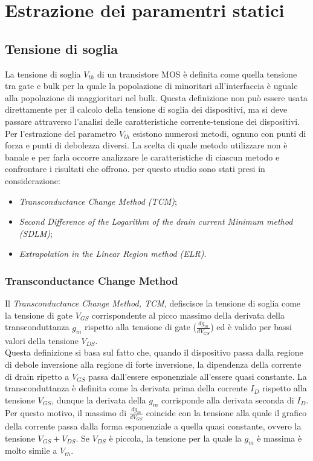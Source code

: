\documentclass[12pt, letterpaper]{book}
\begin{document}
\chapter{Estrazione dei paramentri statici}

\section{Tensione di soglia}

La tensione di soglia $V_{th}$ di un transistore MOS è definita come quella tensione tra gate e bulk per la quale la popolazione di minoritari all’interfaccia è uguale alla popolazione di maggioritari nel bulk. Questa definizione non può essere usata direttamente per il calcolo della tensione di soglia dei dispositivi, ma si deve passare attraverso l'analisi delle caratteristiche corrente-tensione dei dispositivi. \\	
Per l'estrazione del parametro $V_{th}$ esistono numerosi metodi, ognuno con punti di forza e punti di debolezza diversi. La scelta di quale metodo utilizzare non è banale e per farla occorre analizzare le caratteristiche di ciascun metodo e confrontare i risultati che offrono. per questo studio sono stati presi in considerazione:

\begin{itemize}
  \item \emph{Transconductance Change Method (TCM)};
  \item \emph{Second Difference of the Logarithm of the drain current Minimum method (SDLM)};
  \item \emph{Extrapolation in the Linear Region method (ELR)}.
\end{itemize}


\subsection{Transconductance Change Method}

Il \emph{Transconductance Change Method, TCM,} defiscisce la tensione di soglia come la tensione di gate $V_{GS}$ corrispondente al picco massimo della derivata della transconduttanza $g_m$ rispetto alla tensione di gate ($\frac{dg_m}{dV_ {GS}}$) ed è valido per bassi valori della tensione $V_{DS}$.\\
Questa definizione si basa sul fatto che, quando il dispositivo passa dalla regione di debole inversione alla regione di forte inversione, la dipendenza della corrente di drain ripetto a $V_{GS}$ passa dall'essere esponenziale all'essere quasi constante. 
La transconduttanza è definita come la derivata prima della corrente $I_D$ rispetto alla tensione $V_{GS}$, dunque la derivata della $g_m$ corrisponde alla derivata seconda di $I_D$. Per questo motivo, il massimo di $\frac{dg_m}{dV_{GS}}$ coincide con la tensione alla quale il grafico della corrente passa dalla forma esponenziale a quella quasi constante, ovvero la tensione $V_{GS}+V_{DS}$. Se $V_{DS}$ è piccola, la tensione per la quale la $g_m$ è massima è molto simile a $V_{th}$.\\
\end{document}

